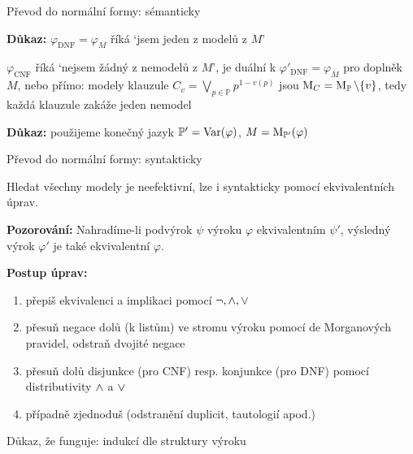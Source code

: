 \documentclass{beamer}
\begin{document}
\begin{frame}{Převod do normální formy: sémanticky}
    

    \textbf{Důkaz:} $\varphi_{\mathrm{DNF}}=\varphi_M$ říká  \alert{`jsem jeden z modelů z $M$'}

    $\varphi_{\mathrm{CNF}}$ říká \alert{`nejsem žádný z nemodelů z $M$'}, je duální k $\varphi'_{\mathrm{DNF}}=\varphi_{\overline{M}}$ pro doplněk $M$, nebo přímo: modely klauzule $C_v=\bigvee_{p\in\mathbb P}p^{1-v(p)}$ jsou $\operatorname{M}_C=\operatorname{M}_\mathbb P\setminus\{v\}$, tedy každá klauzule zakáže jeden nemodel\hfill\qedsymbol

    \medskip

    \textbf{Důkaz:} použijeme konečný jazyk $\mathbb P'=\operatorname{Var}(\varphi)$, $M=\operatorname{M}_{\mathbb P'}(\varphi)$\hfill\qedsymbol

\end{frame}


\begin{frame}{Převod do normální formy: syntakticky}

    Hledat všechny modely je neefektivní, lze i syntakticky pomocí \alert{ekvivalentních úprav}.

    \textbf{Pozorování:} Nahradíme-li podvýrok $\psi$ výroku $\varphi$ ekvivalentním $\psi'$, výsledný výrok $\varphi'$ je také ekvivalentní $\varphi$.

    \textbf{Postup úprav:}
    \begin{enumerate}
        \item přepiš ekvivalenci a implikaci pomocí $\neg,{\land},{\lor}$
        \item přesuň negace dolů (k listům) ve stromu výroku pomocí de Morganových pravidel, odstraň dvojité negace
        \item přesuň dolů disjunkce (pro CNF) resp. konjunkce (pro DNF) pomocí distributivity ${\land}$ a ${\lor}$
        \item případně zjednoduš (odstranění duplicit, tautologií apod.)
    \end{enumerate}

    Důkaz, že funguje: indukcí dle struktury výroku

\end{frame}
\end{document}
